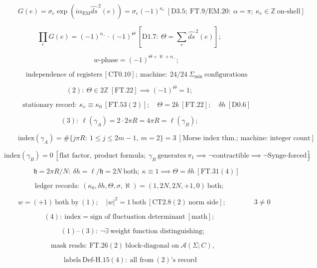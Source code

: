 \begin{theorem}
\[
\qquad G(e)=\sigma_e\exp(i\alpha_{\mathrm{EM}}\widehat{ds}^{\,2}(e))=\sigma_e(-1)^{\kappa_e}\ [\mathrm{D3.5};\ \mathrm{FT.9}/\mathrm{EM.20}:\ \alpha=\pi;\ \kappa_e\in\mathbb Z\ \text{on-shell}]
\]

\[
\prod_eG(e)=(-1)^{n_-}\cdot(-1)^{\Theta}\ [\mathrm{D1.7}:\ \Theta=\textstyle\sum_e\widehat{ds}^{\,2}(e)];
\]

\[
\qquad w\text{-phase}=(-1)^{\Theta+\aleph+n_-};
\]

\[
\qquad \text{independence of registers}\ [\mathrm{CT0.10}];\ \text{machine}:\ 24/24\ \Sigma_{\min}\ \text{configurations}
\]

\[
(2):\ \Theta\in2\mathbb Z\ [\mathrm{FT.22}]\implies(-1)^\Theta=1;
\]

\[
\qquad \text{stationary record}:\ \kappa_e\equiv\kappa_0\ [\mathrm{FT.53}(2)];\quad\Theta=2k\ [\mathrm{FT.22}];\quad\delta h\ [\mathrm{D0.6}]
\]

\[
(3):\ \ell(\gamma_A)=2\cdot2\pi R=4\pi R=\ell(\gamma_B);
\]

\[
\qquad \text{index}(\gamma_A)=\#\{j\pi R:\ 1\le j\le2m-1,\ m=2\}=3\ [\text{Morse index thm.; machine: integer count}]
\]

\[
\text{index}(\gamma_B)=0\ [\text{flat factor},\ \text{product formula};\ \gamma_B\ \text{generates}\ \pi_1\implies\neg\text{contractible}\implies\neg\text{Synge-forced}];
\]

\[
\qquad \mathfrak h=2\pi R/N:\ \delta h=\ell/\mathfrak h=2N\ \text{both};\ \kappa\equiv1\implies\Theta=\delta h\ [\mathrm{FT.31}(4)]
\]

\[
\text{ledger records}:\ (\kappa_0,\delta h,\Theta,\sigma,\aleph)=(1,2N,2N,+1,0)\ \text{both};
\]

\[
\qquad w=(+1)\ \text{both by}\ (1);\quad|w|^2=1\ \text{both}\ [\mathrm{CT2.8}(2)\ \text{norm side}];\qquad \qquad 3\ne0
\]

\[
(4):\ \text{index}=\text{sign of fluctuation determinant}\ [\text{math}];
\]

\[
\quad (1)\text{--}(3):\ \neg\exists\ \text{weight function distinguishing};
\]

\[
\quad\text{mask reads}:\ \mathrm{FT.26}(2)\ \text{block-diagonal on}\ \mathcal A(\Sigma;C),
\]

\[
\ \text{labels}\ \mathrm{Def\text{-}H.15}(4):\ \text{all from}\ (2)\text{'s record}
\]


\end{theorem}

